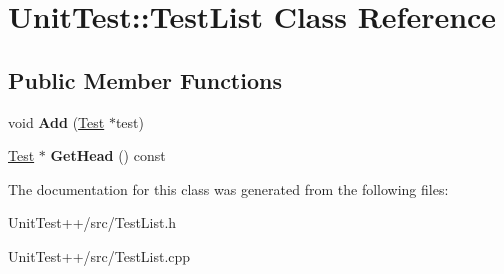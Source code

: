 \hypertarget{classUnitTest_1_1TestList}{\section{Unit\-Test\-:\-:Test\-List Class Reference}
\label{classUnitTest_1_1TestList}
}
\subsection*{Public Member Functions}
\begin{DoxyCompactItemize}
\item 
\hypertarget{classUnitTest_1_1TestList_abdfa2c0587c70ff0581ea059b7b39a49}{void {\bfseries Add} (\hyperlink{classUnitTest_1_1Test}{Test} $\ast$test)}\label{classUnitTest_1_1TestList_abdfa2c0587c70ff0581ea059b7b39a49}

\item 
\hypertarget{classUnitTest_1_1TestList_a216e999515bb7a1d704f67e28feaceed}{\hyperlink{classUnitTest_1_1Test}{Test} $\ast$ {\bfseries Get\-Head} () const }\label{classUnitTest_1_1TestList_a216e999515bb7a1d704f67e28feaceed}

\end{DoxyCompactItemize}


The documentation for this class was generated from the following files\-:\begin{DoxyCompactItemize}
\item 
Unit\-Test++/src/Test\-List.\-h\item 
Unit\-Test++/src/Test\-List.\-cpp\end{DoxyCompactItemize}
